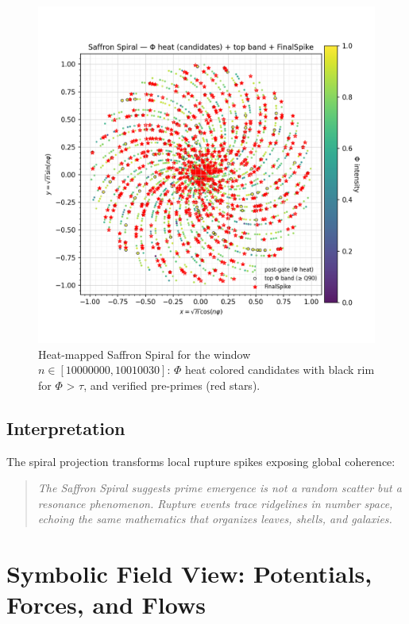 \documentclass[11pt]{article}
\theoremstyle{plain}
\theoremstyle{definition}
\begin{document}
\begin{figure}[h!]
  \includegraphics[width=0.9\linewidth]{spiral_10M_10.1M.png}
  \caption{Heat-mapped Saffron Spiral for the window $n \in [10000000,10010030]$:  
           $\Phi$ heat colored candidates with black rim for $\Phi$ > $\tau$, and verified pre-primes (red stars).}
  \label{fig:saffron-spiral-heatmap}
\end{figure}
\FloatBarrier

\subsection{Interpretation}
The spiral projection transforms local rupture spikes exposing global coherence:
\begin{quote}
\emph{The Saffron Spiral suggests prime emergence is not a random scatter but a resonance phenomenon.  
Rupture events trace ridgelines in number space, echoing the same mathematics that organizes leaves, shells, and galaxies.}
\end{quote}

\section{Symbolic Field View: Potentials, Forces, and Flows}
\end{document}
